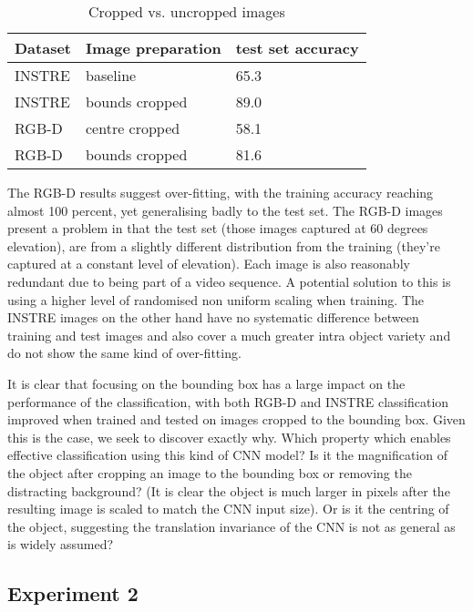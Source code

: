 \begin{table}[h]
  \centering
    \caption{Cropped vs. uncropped images }
    
  \begin{tabular}{ l l l }
    
    Dataset & Image preparation & test set accuracy \\
    \toprule
    
    INSTRE & baseline &  65.3 \\
    INSTRE & bounds cropped & 89.0 \\
    
    RGB-D & centre cropped & 58.1 \\
    RGB-D & bounds cropped & 81.6 \\
    
    \bottomrule
  \end{tabular}
\label{fig:focus_crop}
\end{table}

The RGB-D results suggest over-fitting, with the training accuracy reaching almost 100 percent, yet generalising badly to the test set. The RGB-D images present a problem in that the test set (those images captured at 60 degrees elevation), are from a slightly different distribution from the training (they're captured at a constant level of elevation). Each image is also reasonably redundant due to being part of a video sequence. A potential solution to this is using a higher level of randomised non uniform scaling when training. The INSTRE images on the other hand have no systematic difference between training and test images and also cover a much greater intra object variety and do not show the same kind of over-fitting.

It is clear that focusing on the bounding box has a large impact on the performance of the classification, with both RGB-D and INSTRE classification improved when trained and tested on images cropped to the bounding box. Given this is the case, we seek to discover exactly why. Which property which enables effective classification using this kind of CNN model? Is it the magnification of the object after cropping an image to the bounding box or removing the distracting background? (It is clear the object is much larger in pixels after the resulting image is scaled to match the CNN input size). Or is it the centring of the object, suggesting the translation invariance of the CNN is not as general as is widely assumed?


\subsection {Experiment 2}

